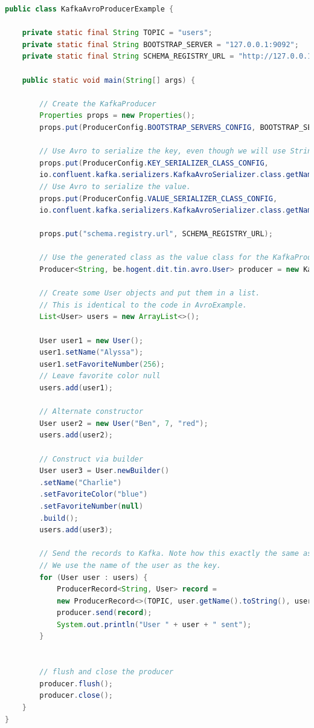 \documentclass[a4paper,10pt,twoside]{report}
\begin{document}
\newpage

\begin{lstlisting}[language=Java]
public class KafkaAvroProducerExample {
	
	private static final String TOPIC = "users";
	private static final String BOOTSTRAP_SERVER = "127.0.0.1:9092";
	private static final String SCHEMA_REGISTRY_URL = "http://127.0.0.1:8081";

	public static void main(String[] args) {
		
		// Create the KafkaProducer
		Properties props = new Properties();
		props.put(ProducerConfig.BOOTSTRAP_SERVERS_CONFIG, BOOTSTRAP_SERVER);
		
		// Use Avro to serialize the key, even though we will use Strings as key
		props.put(ProducerConfig.KEY_SERIALIZER_CLASS_CONFIG, 
		io.confluent.kafka.serializers.KafkaAvroSerializer.class.getName());
		// Use Avro to serialize the value. 
		props.put(ProducerConfig.VALUE_SERIALIZER_CLASS_CONFIG, 
		io.confluent.kafka.serializers.KafkaAvroSerializer.class.getName());
		
		props.put("schema.registry.url", SCHEMA_REGISTRY_URL);
		
		// Use the generated class as the value class for the KafkaProducer.
		Producer<String, be.hogent.dit.tin.avro.User> producer = new KafkaProducer<>(props);
		
		// Create some User objects and put them in a list.
		// This is identical to the code in AvroExample.
		List<User> users = new ArrayList<>();
		
		User user1 = new User();
		user1.setName("Alyssa");
		user1.setFavoriteNumber(256);
		// Leave favorite color null
		users.add(user1);
		
		// Alternate constructor
		User user2 = new User("Ben", 7, "red");
		users.add(user2);
		
		// Construct via builder
		User user3 = User.newBuilder()
		.setName("Charlie")
		.setFavoriteColor("blue")
		.setFavoriteNumber(null)
		.build();
		users.add(user3);
		
		// Send the records to Kafka. Note how this exactly the same as before.
		// We use the name of the user as the key.
		for (User user : users) {
			ProducerRecord<String, User> record = 
			new ProducerRecord<>(TOPIC, user.getName().toString(), user);			
			producer.send(record);
			System.out.println("User " + user + " sent");
		}
		
		
		// flush and close the producer
		producer.flush();
		producer.close();	
	}	
}
\end{lstlisting}
\end{document}
